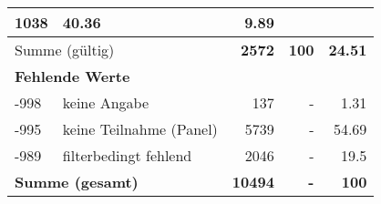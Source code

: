 \begin{longtable}{lXrrr}
       \num{1038} &
       \num[round-mode=places,round-precision=2]{40,36} &
         \num[round-mode=places,round-precision=2]{9,89} \\
     \midrule
     \multicolumn{2}{l}{Summe (gültig)} &
       \textbf{\num{2572}} &
     \textbf{100} &
       \textbf{\num[round-mode=places,round-precision=2]{24,51}} \\
     \multicolumn{5}{l}{\textbf{Fehlende Werte}}\\
       -998 &
       keine Angabe &
         \num{137} &
        - &
         \num[round-mode=places,round-precision=2]{1,31} \\
       -995 &
       keine Teilnahme (Panel) &
         \num{5739} &
        - &
         \num[round-mode=places,round-precision=2]{54,69} \\
       -989 &
       filterbedingt fehlend &
         \num{2046} &
        - &
         \num[round-mode=places,round-precision=2]{19,5} \\
     \midrule
     \multicolumn{2}{l}{\textbf{Summe (gesamt)}} &
          \textbf{\num{10494}} &
        \textbf{-} &
        \textbf{100} \\
     \bottomrule
     \end{longtable}
     
